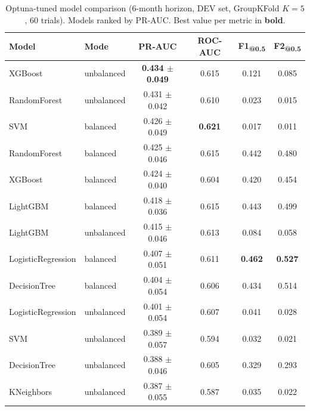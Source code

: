 \begin{table}[ht]
\centering
\caption[Optuna-tuned model comparison, 6-month horizon]{Optuna-tuned model comparison (6-month horizon, DEV set, GroupKFold $K\!=\!5$, 60 trials). Models ranked by PR-AUC. Best value per metric in \textbf{bold}.}
\label{tab:step5v2_tuning}
\small
\begin{tabular}{llcccc}
\toprule
Model & Mode & PR-AUC & ROC-AUC & F1\textsubscript{@0.5} & F2\textsubscript{@0.5} \\
\midrule
XGBoost & unbalanced & \textbf{0.434 $\pm$ 0.049} & 0.615 & 0.121 & 0.085 \\
RandomForest & unbalanced & 0.431 $\pm$ 0.042 & 0.610 & 0.023 & 0.015 \\
SVM & balanced & 0.426 $\pm$ 0.049 & \textbf{0.621} & 0.017 & 0.011 \\
RandomForest & balanced & 0.425 $\pm$ 0.046 & 0.615 & 0.442 & 0.480 \\
XGBoost & balanced & 0.424 $\pm$ 0.040 & 0.604 & 0.420 & 0.454 \\
LightGBM & balanced & 0.418 $\pm$ 0.036 & 0.615 & 0.443 & 0.499 \\
LightGBM & unbalanced & 0.415 $\pm$ 0.046 & 0.613 & 0.084 & 0.058 \\
LogisticRegression & balanced & 0.407 $\pm$ 0.051 & 0.611 & \textbf{0.462} & \textbf{0.527} \\
DecisionTree & balanced & 0.404 $\pm$ 0.054 & 0.606 & 0.434 & 0.514 \\
LogisticRegression & unbalanced & 0.401 $\pm$ 0.054 & 0.607 & 0.041 & 0.028 \\
SVM & unbalanced & 0.389 $\pm$ 0.057 & 0.594 & 0.032 & 0.021 \\
DecisionTree & unbalanced & 0.388 $\pm$ 0.046 & 0.605 & 0.329 & 0.293 \\
KNeighbors & unbalanced & 0.387 $\pm$ 0.055 & 0.587 & 0.035 & 0.022 \\
\bottomrule
\end{tabular}
\end{table}
